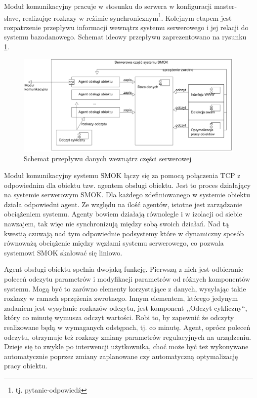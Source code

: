 \documentclass[a4paper,polish,12pt,twoside]{article}
\begin{document}
Moduł komunikacyjny pracuje w stosunku do serwera w konfiguracji master-slave, realizując rozkazy w reżimie synchronicznym\footnote{tj. pytanie-odpowiedź}. Kolejnym etapem jest rozpatrzenie przepływu informacji wewnątrz systemu serwerowego i jej relacji do systemu bazodanowego. Schemat ideowy przepływu zaprezentowano na rysunku \ref{fig:smokarc_serversite}.

\begin{figure}[h]
	\centering \includegraphics[width=15cm]{smokarc_serversite}
	\caption{Schemat przepływu danych wewnątrz części serwerowej}
	\label{fig:smokarc_serversite}
\end{figure}

Moduł komunikacyjny systemu SMOK łączy się za pomocą połączenia TCP z odpowiednim dla obiektu tzw. agentem obsługi obiektu. Jest to proces działający na systemie serwerowym SMOK. Dla każdego zdefiniowanego w systemie obiektu działa odpowiedni agent. Ze względu na ilość agentów, istotne jest zarządzanie obciążeniem systemu. Agenty bowiem działają równolegle i w izolacji od siebie nawzajem, tak więc nie synchronizują między sobą swoich działań. Nad tą kwestią czuwają nad tym odpowiednie podsystemy które w dynamiczny sposób równoważą obciążenie między węzłami systemu serwerowego, co pozwala systemowi SMOK skalować się liniowo.

Agent obsługi obiektu spełnia dwojaką funkcję. Pierwszą z nich jest odbieranie poleceń odczytu parametrów i modyfikacji parametrów od różnych komponentów systemu. Mogą być to zarówno elementy korzystające z danych, wysyłając takie rozkazy w ramach sprzężenia zwrotnego.  Innym elementem, którego jedynym zadaniem jest wysyłanie rozkazów odczytu, jest komponent ,,Odczyt cykliczny``, który co minutę wymusza odczyt wartości. Robi to, by zapewnić że odczyty realizowane będą w wymaganych odstępach, tj. co minutę. Agent, oprócz poleceń odczytu, otrzymuje też rozkazy zmiany parametrów regulacyjnych na urządzeniu. Dzieje się to zwykle po interwencji użytkownika, choć może być też wykonywane automatycznie poprzez zmiany zaplanowane czy automatyczną optymalizację pracy obiektu.
\end{document}
